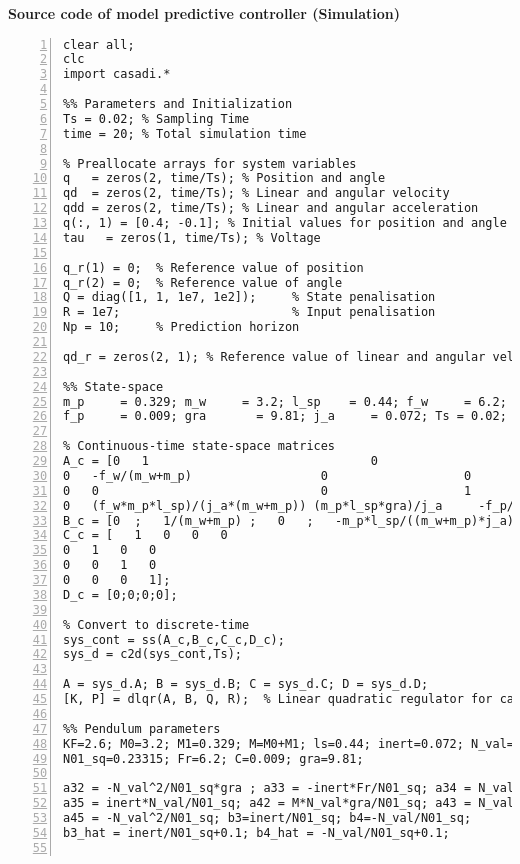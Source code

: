 \normalsize\bf{Source code of model predictive controller (Simulation)}
\label{mpcSim.m}
\vspace{1cm}
\begin{lstlisting}[numbers=left,basicstyle=\scriptsize,caption={Source code of model predictive controller (Simulation).},captionpos=b]	
% Clear workspace, command window, and import CasADi library
clear all;
clc
import casadi.*

%% Parameters and Initialization
Ts = 0.02; % Sampling Time
time = 20; % Total simulation time

% Preallocate arrays for system variables
q   = zeros(2, time/Ts); % Position and angle
qd  = zeros(2, time/Ts); % Linear and angular velocity
qdd = zeros(2, time/Ts); % Linear and angular acceleration
q(:, 1) = [0.4; -0.1]; % Initial values for position and angle
tau   = zeros(1, time/Ts); % Voltage

q_r(1) = 0;  % Reference value of position
q_r(2) = 0;  % Reference value of angle
Q = diag([1, 1, 1e7, 1e2]);     % State penalisation 
R = 1e7;                        % Input penalisation
Np = 10;     % Prediction horizon 

qd_r = zeros(2, 1); % Reference value of linear and angular velocity

%% State-space
m_p     = 0.329; m_w     = 3.2; l_sp    = 0.44; f_w     = 6.2; 
f_p     = 0.009; gra       = 9.81; j_a     = 0.072; Ts = 0.02; 

% Continuous-time state-space matrices
A_c = [0   1                               0                   0
0   -f_w/(m_w+m_p)                  0                   0
0   0                               0                   1
0   (f_w*m_p*l_sp)/(j_a*(m_w+m_p)) (m_p*l_sp*gra)/j_a     -f_p/j_a];   
B_c = [0  ;   1/(m_w+m_p) ;   0   ;   -m_p*l_sp/((m_w+m_p)*j_a)];
C_c = [   1   0   0   0
0   1   0   0
0   0   1   0
0   0   0   1];
D_c = [0;0;0;0];

% Convert to discrete-time
sys_cont = ss(A_c,B_c,C_c,D_c);
sys_d = c2d(sys_cont,Ts);

A = sys_d.A; B = sys_d.B; C = sys_d.C; D = sys_d.D;
[K, P] = dlqr(A, B, Q, R);	% Linear quadratic regulator for callculating the P matrix

%% Pendulum parameters
KF=2.6; M0=3.2; M1=0.329; M=M0+M1; ls=0.44; inert=0.072; N_val=0.1446;
N01_sq=0.23315; Fr=6.2; C=0.009; gra=9.81;

a32 = -N_val^2/N01_sq*gra ; a33 = -inert*Fr/N01_sq; a34 = N_val*C/N01_sq; 
a35 = inert*N_val/N01_sq; a42 = M*N_val*gra/N01_sq; a43 = N_val*Fr/N01_sq; a44 = -M*C/N01_sq;
a45 = -N_val^2/N01_sq; b3=inert/N01_sq; b4=-N_val/N01_sq;
b3_hat = inert/N01_sq+0.1; b4_hat = -N_val/N01_sq+0.1;


\end{lstlisting}
